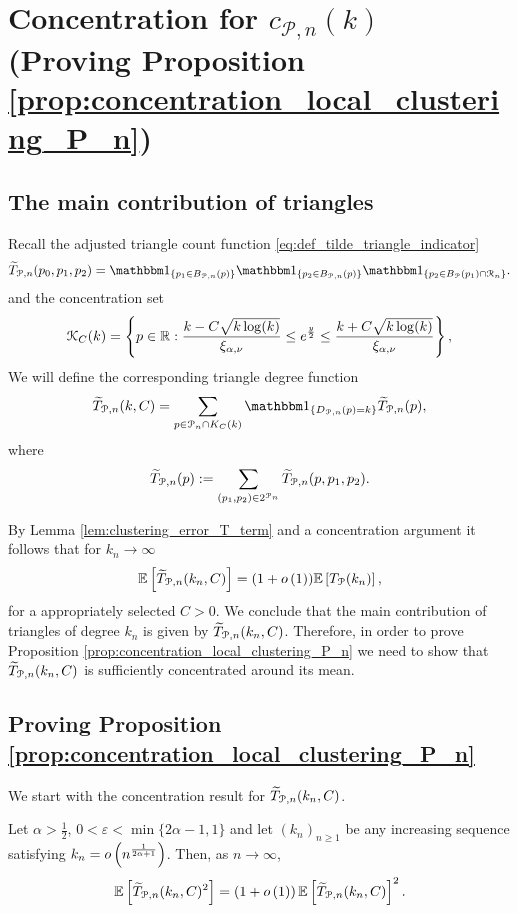 \section{Concentration for $c_{\mathcal{P}, n}(k)$ (Proving Proposition \ref{prop:concentration_local_clustering_P_n})}
\label{sec:concentration_c_P_n}

\subsection{The main contribution of triangles}

Recall the adjusted triangle count function \eqref{eq:def_tilde_triangle_indicator}
\[
	\widetilde{T}_{\Pcal,n}(p_0,p_1,p_2) = \ind{p_1 \in B_{\Pcal,n}(p)}\ind{p_2 \in B_{\Pcal,n}(p)}\ind{p_2 \in B_{\Pcal}(p_1) \cap \Rcal_n}.
\]
and the concentration set
\[
	{\mathcal K}_C(k) = \left\{p \in {\ensuremath{\mathbb R}} : \frac{k - C \sqrt{k \log(k)}}{\xi_{\alpha,\nu}} \le e^{\frac{y}{2}}
		\le \frac{k + C \sqrt{k \log(k)}}{\xi_{\alpha,\nu}} \right\},
\]
We will define the corresponding triangle degree function
\begin{equation}\label{eq:def_degree_triangle_count_in_K}
	\widetilde{T}_{\Pcal,n}(k,C) = \sum_{p \in \Pcal_n \cap K_C(k)} \ind{D_{\Pcal,n}(p) = k} \widetilde{T}_{\Pcal,n}(p),
\end{equation}
where
\[
	\widetilde{T}_{{\mathcal P},n}(p) := \sum_{(p_1, p_2) \in 2^{{\mathcal P}_n}} \widetilde{T}_{{\mathcal P},n}(p,p_1,p_2).
\]

By Lemma \ref{lem:clustering_error_T_term} and a concentration argument it follows that for $k_n \to \infty$
\[
	\mathbb{E}\left[\widetilde{T}_{{\mathcal P},n}(k_n,C)\right] = (1+o\left(1\right))\mathbb{E}\left[T_{{\mathcal P}}(k_n)\right],
\]
for a appropriately selected $C > 0$. We conclude that the main contribution of triangles of degree $k_n$ is given by $\widetilde{T}_{{\mathcal P},n}(k_n,C)$. Therefore, in order to prove Proposition \ref{prop:concentration_local_clustering_P_n} we need to show that $\widetilde{T}_{{\mathcal P},n}(k_n,C)$ is sufficiently concentrated around its mean.

\subsection{Proving Proposition \ref{prop:concentration_local_clustering_P_n}}

We start with the concentration result for $\widetilde{T}_{{\mathcal P},n}(k_n,C)$.

\begin{proposition}\label{prop:concentration_tilde_T_P_n}
Let $\alpha > \frac{1}{2}$, $0 < \varepsilon < \min\{2\alpha - 1,1\}$ and let $(k_n)_{n \ge 1}$ be any increasing sequence satisfying $k_n = o\left(n^{\frac{1}{2\alpha+1}}\right)$. Then, as $n \to \infty$,
\[
	\mathbb{E}\left[\widetilde{T}_{{\mathcal P},n}(k_n, C)^2\right] = \left(1 + o\left(1\right)\right)\mathbb{E}\left[\widetilde{T}_{{\mathcal P},n}(k_n, C)\right]^2.
\]
\end{proposition}

